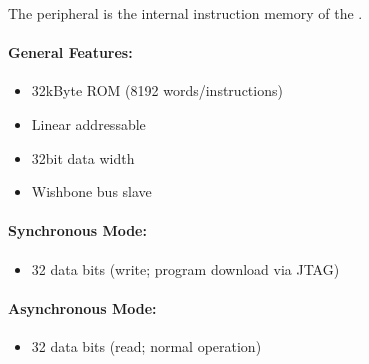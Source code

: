 The \asimemg peripheral is the internal instruction memory of the \aschip.

\paragraph{General Features: }
\begin{itemize}
  \item 32\;kByte ROM (8192 words/instructions)
  \item Linear addressable
  \item 32\;bit data width
  \item Wishbone bus slave
\end{itemize}

\paragraph{Synchronous Mode: }
\begin{itemize}
  \item 32 data bits (write; program download via JTAG)
\end{itemize}

\paragraph{Asynchronous Mode: }
\begin{itemize}
  \item 32 data bits (read; normal operation)
\end{itemize}
